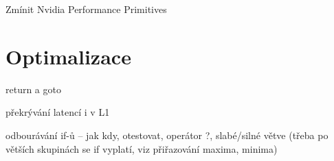 

Zmínit Nvidia Performance Primitives

\section{Optimalizace}

return a goto

překrývání latencí i v L1

odbourávání if-ů -- jak kdy, otestovat, operátor ?,
slabé/silné větve (třeba po větších skupinách se if vyplatí,
viz přiřazování maxima, minima) 